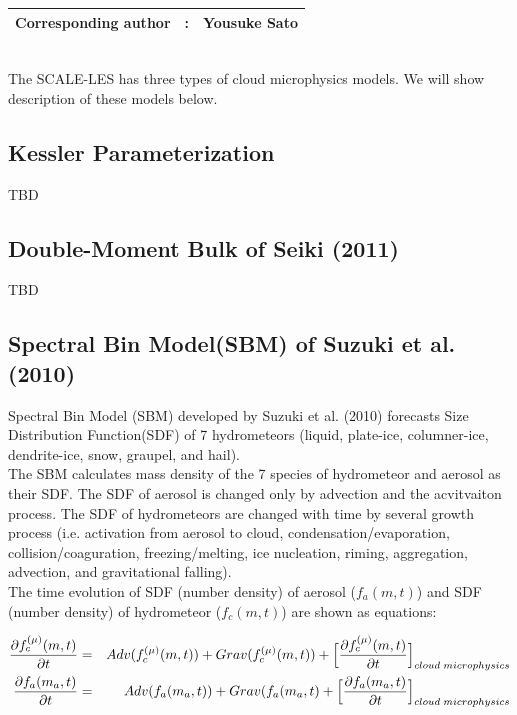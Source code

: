 {\bf \Large 
\begin{tabular}{ccc}
\hline
  Corresponding author & : & Yousuke Sato\\
\hline
\end{tabular}
}
\\
 The SCALE-LES has three types of cloud microphysics models. We will show description of these models below.

\subsection{Kessler Parameterization}
{\Huge TBD}

\subsection{Double-Moment Bulk of Seiki (2011)}
{\Huge TBD}

\subsection{Spectral Bin Model(SBM) of Suzuki et al. (2010)}
Spectral Bin Model (SBM) developed by Suzuki et al. (2010) forecasts Size Distribution Function(SDF) of 7 hydrometeors (liquid, plate-ice, columner-ice, dendrite-ice, snow, graupel, and hail). \\
The SBM calculates mass density of the 7 species of hydrometeor and aerosol as their SDF. The SDF of aerosol is changed only by advection and the acvitvaiton process. The SDF of hydrometeors are changed with time by several growth process (i.e. activation from aerosol to cloud, condensation/evaporation, collision/coaguration, freezing/melting, ice nucleation, riming, aggregation, advection, and gravitational falling). \\
The time evolution of SDF (number density) of aerosol ($f_{a}(m,t)$) and SDF (number density) of hydrometeor ($f_{c}(m,t)$) are shown as equations:

\begin{eqnarray}
\frac{\partial f^{(\mu)}_{c}(m,t)}{\partial t}&=&Adv(f^{(\mu)}_{c}(m,t))+Grav(f^{(\mu)}_{c}(m,t))+\Bigl[ \frac{\partial f^{(\mu)}_{c}(m,t)}{\partial t}\Bigr ]_{cloud\;microphysics}\\
\frac{\partial f_{a}(m_{a},t)}{\partial t}&=&Adv(f_{a}(m_{a},t))+Grav(f_{a}(m_{a},t)+\Bigl[ \frac{\partial f_{a}(m_{a},t)}{\partial t} \Bigr ]_{cloud\;microphysics}
\end{eqnarray} 

